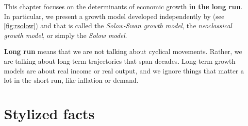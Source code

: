 
This chapter focuses on the determinants of economic growth \textbf{in the long run}. In particular, we present a growth model developed independently by \cite{Solow1956contribution} (see \autoref{fig:rsolow}) and \cite{Swan1956Economic} that is called the \textit{Solow-Swan growth model}, the \textit{neoclassical growth model}, or simply the \textit{Solow model}.

\textbf{Long run} means that we are not talking about cyclical movements. Rather, we are talking about long-term trajectories that span decades. Long-term growth models are about real income or real output, and we ignore things that matter a lot in the short run, like inflation or demand. 



\section{Stylized facts}



